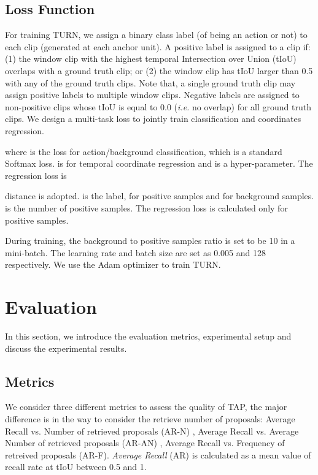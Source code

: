 \documentclass[10pt,twocolumn,letterpaper]{article}
\begin{document}
\subsection{Loss Function}
For training TURN, we assign a binary class label (of being an action or not) to each clip (generated at each anchor unit). A positive label is assigned to a clip if: (1) the window clip with the highest temporal Intersection over Union (tIoU) overlaps with a ground truth clip; or (2) the window clip has tIoU larger than 0.5 with any of the ground truth clips. Note that, a single ground truth clip may assign positive labels to multiple window clips. Negative labels are assigned to non-positive clips whose tIoU is equal to 0.0 (\emph{i.e.} no overlap) for all ground truth clips. We design a multi-task loss  to jointly train classification and coordinates regression.

where  is the loss for action/background classification, which is a standard Softmax loss.  is for temporal coordinate regression and  is a hyper-parameter. The regression loss is 

 distance is adopted.  is the label,  for positive samples and  for background samples.  is the number of positive samples. The regression loss is calculated only for positive samples. 

During training, the background to positive samples ratio is set to be 10 in a mini-batch. The learning rate and batch size are set as 0.005 and 128 respectively. We use the Adam \cite{kingma2014adam} optimizer to train TURN.

\section{Evaluation}
In this section, we introduce the evaluation metrics, experimental setup and discuss the experimental results.

\subsection{Metrics}

  We consider three different metrics to assess the quality of TAP, the major difference is in the way to consider the retrieve number of proposals: Average Recall vs. Number of retrieved proposals (AR-N) \cite{yu2015fast,hosang2016makes}, Average Recall vs. Average Number of retrieved proposals (AR-AN) \cite{escorcia2016daps}, Average Recall vs. Frequency of retreived proposals (AR-F). \textit{Average Recall} (AR) is calculated as a mean value of recall rate at tIoU between 0.5 and 1.
\end{document}
